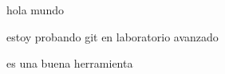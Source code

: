 \documentclass{article}
\begin{document}
hola mundo

estoy probando git en laboratorio avanzado

es una buena herramienta
\end{document}
